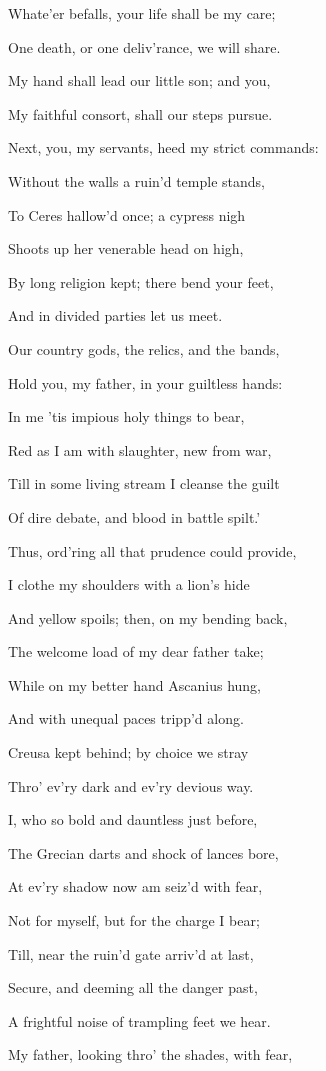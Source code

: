 Whate’er befalls, your life shall be my care;

One death, or one deliv’rance, we will share.

My hand shall lead our little son; and you,

My faithful consort, shall our steps pursue.

Next, you, my servants, heed my strict commands:

Without the walls a ruin’d temple stands,

To Ceres hallow’d once; a cypress nigh

Shoots up her venerable head on high,

By long religion kept; there bend your feet,

And in divided parties let us meet.

Our country gods, the relics, and the bands,

Hold you, my father, in your guiltless hands:

In me ’tis impious holy things to bear,

Red as I am with slaughter, new from war,

Till in some living stream I cleanse the guilt

Of dire debate, and blood in battle spilt.’

Thus, ord’ring all that prudence could provide,

I clothe my shoulders with a lion’s hide

And yellow spoils; then, on my bending back,

The welcome load of my dear father take;

While on my better hand Ascanius hung,

And with unequal paces tripp’d along.

Creusa kept behind; by choice we stray

Thro’ ev’ry dark and ev’ry devious way.

I, who so bold and dauntless just before,

The Grecian darts and shock of lances bore,

At ev’ry shadow now am seiz’d with fear,

Not for myself, but for the charge I bear;

Till, near the ruin’d gate arriv’d at last,

Secure, and deeming all the danger past,

A frightful noise of trampling feet we hear.

My father, looking thro’ the shades, with fear,

